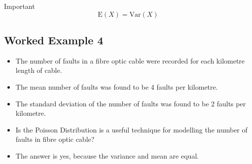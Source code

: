 \documentclass[a4paper,12pt]{article}
\begin{document}
\noindent Important 
\[ \mbox{E}(X) = \mbox{Var}(X)\]

\subsection*{Worked Example 4} 

\begin{itemize}
\item The number of faults in a fibre optic cable were recorded for each kilometre length of cable.
\item The mean number of faults was found to be 4 faults per kilometre.
\item The standard deviation of the number of faults was found to be 2 faults per kilometre.
\item Is the Poisson Distribution is a useful technique for modelling the number of faults in fibre optic cable?
\item The answer is yes, because the variance and mean are equal. 
\end{itemize}
\end{document}
